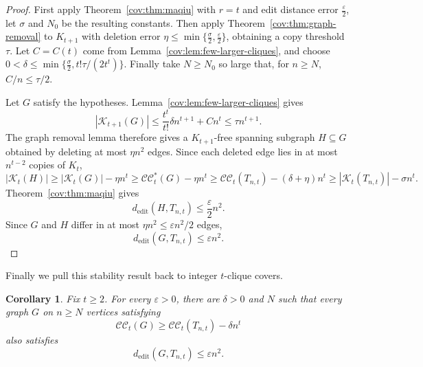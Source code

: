 \documentclass[11pt]{article}
\numberwithin{equation}{section}
\newtheorem{corollary}[theorem]{Corollary}
\theoremstyle{remark}
\newcommand{\e}{\varepsilon}
\newcommand{\CC}{\mathcal{CC}}
\newcommand{\CCstar}{\mathcal{CC}^{*}}
\newcommand{\ed}{d_{\mathrm{edit}}}
\begin{document}
\begin{proof}

First apply Theorem~\ref{cov:thm:maqiu} with \(r=t\) and edit distance error \(\frac{\e}{2}\),
let \(\sigma\) and \(N_0\) be the resulting constants. Then apply Theorem~\ref{cov:thm:graph-removal}
to \(K_{t+1}\) with deletion error \(\eta\le\min\{\frac\sigma2,\frac\e2\}\), obtaining a copy threshold \(\tau\).
Let \(C=C(t)\) come from Lemma~\ref{cov:lem:few-larger-cliques}, and choose \(0<\delta\le\min\{\frac\sigma2,t!\tau/(2t^t)\}\).
Finally take \(N\ge N_0\) so large that, for \(n\ge N\), \(C/n\le\tau/2\).

Let \(G\) satisfy the hypotheses.  Lemma~\ref{cov:lem:few-larger-cliques} gives
\begin{equation*}
|\mathcal K_{t+1}(G)|
 \le \frac{t^t}{t!}\delta n^{t+1}+Cn^t
 \le \tau n^{t+1}.
\end{equation*}
The graph removal lemma therefore gives a \(K_{t+1}\)-free spanning subgraph \(H\subseteq G\) obtained by
deleting at most \(\eta n^2\) edges.  Since each deleted edge lies in at most \(n^{t-2}\) copies of \(K_t\),
\begin{equation*}
|\mathcal K_t(H)|
 \ge |\mathcal K_t(G)|-\eta n^t
 \ge \CCstar_t(G)-\eta n^t
 \ge \CC_t(T_{n,t})-(\delta+\eta)n^t\ge|\mathcal K_t(T_{n,t})|-\sigma n^t.
\end{equation*}
Theorem~\ref{cov:thm:maqiu} gives
\begin{equation*}
\ed(H,T_{n,t})\le \frac{\varepsilon}{2}n^2.
\end{equation*}
Since \(G\) and \(H\) differ in at most \(\eta n^2\le \varepsilon n^2/2\) edges,
\begin{equation*}
\ed(G,T_{n,t})\le \varepsilon n^2.
\end{equation*}
\end{proof}

Finally we pull this stability result back to integer \(t\)-clique covers.

\begin{corollary}
  \label{cov:cor:integer-stability}
Fix \(t\ge2\).  For every \(\varepsilon>0\), there are \(\delta>0\) and \(N\) such that
every graph \(G\) on \(n\ge N\) vertices satisfying
\begin{equation*}
\CC_t(G)\ge \CC_t(T_{n,t})-\delta n^t
\end{equation*}
also satisfies
\begin{equation*}
\ed(G,T_{n,t})\le \varepsilon n^2.
\end{equation*}
\end{corollary}
\end{document}
